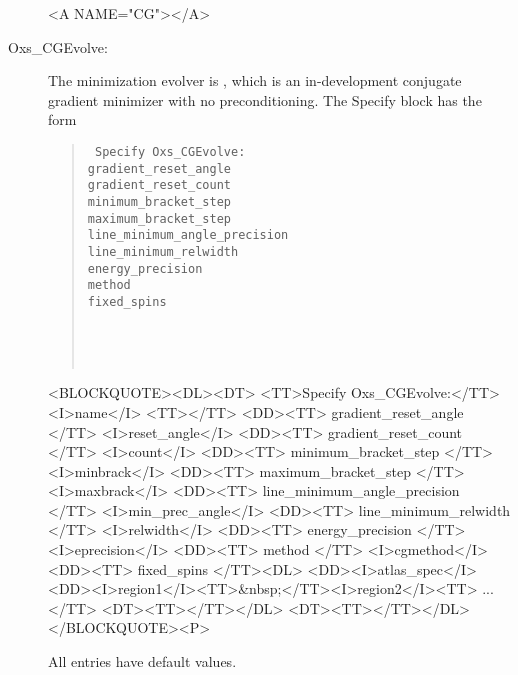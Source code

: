 \begin{description}
\begin{rawhtml}<A NAME="CG"></A>\end{rawhtml}%
%
\item[Oxs\_CGEvolve:\label{html:CGEvolve}]
The minimization evolver is , which is an
in-development conjugate gradient minimizer with no preconditioning. The
Specify block has the form
   \begin{latexonly}
   \begin{quote}\tt
   Specify Oxs\_CGEvolve: \ocb\\
    \bi gradient\_reset\_angle   \\
    \bi gradient\_reset\_count   \\
    \bi minimum\_bracket\_step   \\
    \bi maximum\_bracket\_step   \\
    \bi line\_minimum\_angle\_precision \\
    \bi line\_minimum\_relwidth  \\
    \bi energy\_precision \\
    \bi method \\
    \bi fixed\_spins \ocb\\
    \bi\bi {}\\
    \bi\bi  {}\\
    \bi\ccb\\
   \ccb
   \end{quote}
   \end{latexonly}%
   \begin{rawhtml}<BLOCKQUOTE><DL><DT>
   <TT>Specify Oxs_CGEvolve:</TT><I>name</I> <TT>{</TT>
   <DD><TT> gradient_reset_angle </TT> <I>reset_angle</I>
   <DD><TT> gradient_reset_count </TT> <I>count</I>
   <DD><TT> minimum_bracket_step </TT> <I>minbrack</I>
   <DD><TT> maximum_bracket_step </TT> <I>maxbrack</I>
   <DD><TT> line_minimum_angle_precision </TT> <I>min_prec_angle</I>
   <DD><TT> line_minimum_relwidth </TT> <I>relwidth</I>
   <DD><TT> energy_precision </TT> <I>eprecision</I>
   <DD><TT> method </TT> <I>cgmethod</I>
   <DD><TT> fixed_spins {</TT><DL>
       <DD><I>atlas_spec</I>
       <DD><I>region1</I><TT>&nbsp;</TT><I>region2</I><TT> ...</TT>
       <DT><TT>}</TT></DL>
   <DT><TT>}</TT></DL></BLOCKQUOTE><P>
   \end{rawhtml}
All entries have default values.


\end{description}
